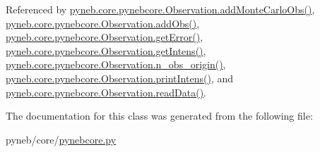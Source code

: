 Referenced by \hyperlink{pynebcore_8py_source_l03947}{pyneb.\+core.\+pynebcore.\+Observation.\+add\+Monte\+Carlo\+Obs()}, \hyperlink{pynebcore_8py_source_l03467}{pyneb.\+core.\+pynebcore.\+Observation.\+add\+Obs()}, \hyperlink{pynebcore_8py_source_l03809}{pyneb.\+core.\+pynebcore.\+Observation.\+get\+Error()}, \hyperlink{pynebcore_8py_source_l03782}{pyneb.\+core.\+pynebcore.\+Observation.\+get\+Intens()}, \hyperlink{pynebcore_8py_source_l03536}{pyneb.\+core.\+pynebcore.\+Observation.\+n\+\_\+obs\+\_\+origin()}, \hyperlink{pynebcore_8py_source_l03836}{pyneb.\+core.\+pynebcore.\+Observation.\+print\+Intens()}, and \hyperlink{pynebcore_8py_source_l03589}{pyneb.\+core.\+pynebcore.\+Observation.\+read\+Data()}.



The documentation for this class was generated from the following file\+:\begin{DoxyCompactItemize}
\item 
pyneb/core/\hyperlink{pynebcore_8py}{pynebcore.\+py}\end{DoxyCompactItemize}
